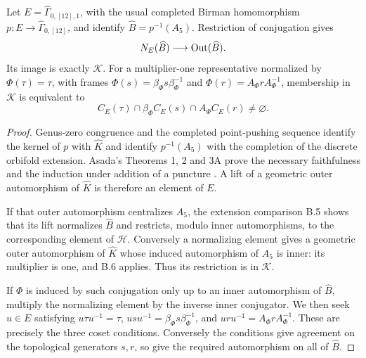 Let \(E=\widehat\Gamma_{0,[12],1}\), with the usual completed
Birman homomorphism \(p:E\to\widehat\Gamma_{0,[12]}\), and identify
\(\widehat B=p^{-1}(A_5)\). Restriction of conjugation gives
\[
 N_E(\widehat B)\longrightarrow\operatorname{Out}(\widehat B).
\]
Its image is exactly \(\mathcal K\). For a multiplier-one
representative normalized by \(\Phi(\tau)=\tau\), with frames
\(\Phi(s)=\beta_\Phi s\beta_\Phi^{-1}\) and
\(\Phi(r)=A_\Phi r A_\Phi^{-1}\), membership in \(\mathcal K\)
is equivalent to
\[
 C_E(\tau)\cap\beta_\Phi C_E(s)\cap A_\Phi C_E(r)\ne\varnothing.
\]
\begin{proof}
Genus-zero congruence and the completed point-pushing sequence identify
the kernel of \(p\) with \(\widehat K\) and identify
\(p^{-1}(A_5)\) with the completion of the discrete orbifold
extension. Asada's Theorems 1, 2 and 3A prove the necessary
faithfulness and the induction under addition of a puncture
\citep{Asada2001}. A lift of a geometric outer automorphism of
\(\widehat K\) is therefore an element of \(E\).

If that outer automorphism centralizes \(A_5\), the extension
comparison B.5 shows that its lift normalizes \(\widehat B\)
and restricts, modulo inner automorphisms, to the corresponding
element of \(\mathcal H\). Conversely a normalizing element gives
a geometric outer automorphism of \(\widehat K\) whose induced
automorphism of \(A_5\) is inner: its multiplier is one, and B.6
applies. Thus its restriction is in \(\mathcal K\).

If \(\Phi\) is induced by such conjugation only up to an inner
automorphism of \(\widehat B\), multiply the normalizing element
by the inverse inner conjugator. We then seek \(u\in E\) satisfying
\(u\tau u^{-1}=\tau\),
\(usu^{-1}=\beta_\Phi s\beta_\Phi^{-1}\), and
\(uru^{-1}=A_\Phi r A_\Phi^{-1}\).
These are precisely the three coset conditions. Conversely the
conditions give agreement on the topological generators \(s,r\),
so give the required automorphism on all of \(\widehat B\).
\end{proof}

